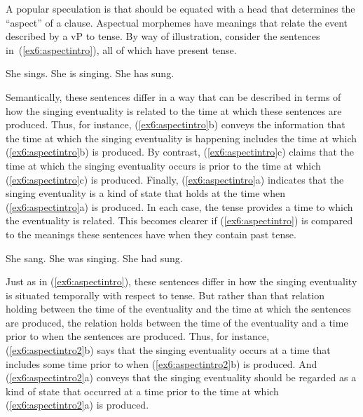 A popular speculation is that  should be equated with a head that determines the ``aspect'' of a clause. %
%
%
%
Aspectual morphemes have meanings that relate the event described by a vP to tense. By way of illustration, consider the sentences in~(\ref{ex6:aspectintro}), all of which have present tense.
\begin{exe}
\raggedright
	\ex \label{ex6:aspectintro}
	\begin{xlist}
		\ex She sings.
		\ex She is singing.
		\ex She has sung.
	\end{xlist}
\end{exe}
Semantically, these sentences differ in a way that can be described in terms of how the singing eventuality is related to the time at which these sentences are produced. Thus, for instance, (\ref{ex6:aspectintro}b) conveys the information that the time at which the singing eventuality is happening includes the time at which (\ref{ex6:aspectintro}b) is produced. By contrast, (\ref{ex6:aspectintro}c) claims that the time at which the singing eventuality occurs is prior to the time at which (\ref{ex6:aspectintro}c) is produced. Finally, (\ref{ex6:aspectintro}a) indicates that the singing eventuality is a kind of state that holds at the time when (\ref{ex6:aspectintro}a) is produced. In each case, the tense provides a time to which the eventuality is related. This becomes clearer if (\ref{ex6:aspectintro}) is compared to the meanings these sentences have when they contain past tense.
\begin{exe}
\raggedright
	\ex \label{ex6:aspectintro2}
	\begin{xlist}
		\ex She sang.
		\ex She was singing.
		\ex She had sung.
	\end{xlist}
\end{exe}
Just as in (\ref{ex6:aspectintro}), these sentences differ in how the singing eventuality is situated temporally with respect to tense. But rather than that relation holding between the time of the eventuality and the time at which the sentences are produced, the relation holds between the time of the eventuality and a time prior to when the sentences are produced. Thus, for instance, (\ref{ex6:aspectintro2}b) says that the singing eventuality occurs at a time that includes some time prior to when (\ref{ex6:aspectintro2}b) is produced. And (\ref{ex6:aspectintro2}a) conveys that the singing eventuality should be regarded as a kind of state that occurred at a time prior to the time at which (\ref{ex6:aspectintro2}a) is produced. 

